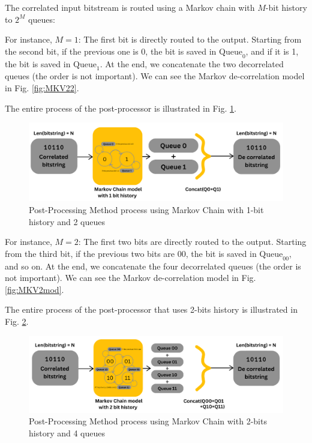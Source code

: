 The correlated input bitstream is routed using a Markov chain with \( M \)-bit history to \( 2^M \) queues:

For instance, \( M=1 \):  
The first bit is directly routed to the output.  
Starting from the second bit, if the previous one is 0, the bit is saved in \( \text{Queue}_0 \), and if it is 1, the bit is saved in \( \text{Queue}_1 \).  
At the end, we concatenate the two decorrelated queues (the order is not important).  
We can see the Markov de-correlation model in Fig. \ref{fig:MKV22}.


The entire process of the post-processor is illustrated in Fig. \ref{fig:MKVpp2}.

\begin{figure}
\centering
\includegraphics[width=16cm]{figures/De-Cor.png}\vspace{-0.2cm}
\caption{Post-Processing Method process using Markov Chain with 1-bit history and 2 queues}
\label{fig:MKVpp2}
\end{figure}



For instance, \( M=2 \):  
The first two bits are directly routed to the output.  
Starting from the third bit, if the previous two bits are \( 00 \), the bit is saved in \( \text{Queue}_{00} \), and so on.  
At the end, we concatenate the four decorrelated queues (the order is not important).  
We can see the Markov de-correlation model in Fig. \ref{fig:MKV2mod}.



The entire process of the post-processor that uses 2-bits history is illustrated in Fig. \ref{fig:MKV2dd}. 


\begin{figure}
\centering
\includegraphics[width=16cm]{figures/De-Cor 2.png}\vspace{-0.2cm}
\caption{Post-Processing Method process using Markov Chain with 2-bits history and 4 queues}
\label{fig:MKV2dd}
\end{figure}

